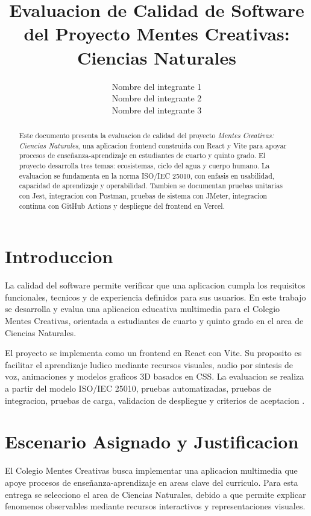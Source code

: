 \documentclass[man,12pt]{apa7}
\title{Evaluacion de Calidad de Software del Proyecto Mentes Creativas: Ciencias Naturales}
\author{Nombre del integrante 1 \\ Nombre del integrante 2 \\ Nombre del integrante 3}
\affiliation{Universidad Cooperativa de Colombia}
\begin{document}
\maketitle

\begin{abstract}
Este documento presenta la evaluacion de calidad del proyecto \textit{Mentes Creativas: Ciencias Naturales}, una aplicacion frontend construida con React y Vite para apoyar procesos de enseñanza-aprendizaje en estudiantes de cuarto y quinto grado. El proyecto desarrolla tres temas: ecosistemas, ciclo del agua y cuerpo humano. La evaluacion se fundamenta en la norma ISO/IEC 25010, con enfasis en usabilidad, capacidad de aprendizaje y operabilidad. Tambien se documentan pruebas unitarias con Jest, integracion con Postman, pruebas de sistema con JMeter, integracion continua con GitHub Actions y despliegue del frontend en Vercel.
\end{abstract}


\section{Introduccion}

La calidad del software permite verificar que una aplicacion cumpla los requisitos funcionales, tecnicos y de experiencia definidos para sus usuarios. En este trabajo se desarrolla y evalua una aplicacion educativa multimedia para el Colegio Mentes Creativas, orientada a estudiantes de cuarto y quinto grado en el area de Ciencias Naturales.

El proyecto se implementa como un frontend en React con Vite. Su proposito es facilitar el aprendizaje ludico mediante recursos visuales, audio por sintesis de voz, animaciones y modelos graficos 3D basados en CSS. La evaluacion se realiza a partir del modelo ISO/IEC 25010, pruebas automatizadas, pruebas de integracion, pruebas de carga, validacion de despliegue y criterios de aceptacion \parencite{iso25010,pressman2020}.

\section{Escenario Asignado y Justificacion}

El Colegio Mentes Creativas busca implementar una aplicacion multimedia que apoye procesos de enseñanza-aprendizaje en areas clave del curriculo. Para esta entrega se selecciono el area de Ciencias Naturales, debido a que permite explicar fenomenos observables mediante recursos interactivos y representaciones visuales.
\end{document}
